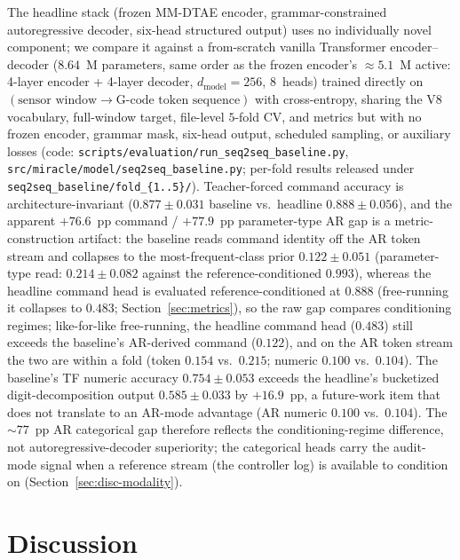 \documentclass[sensors,article,submit,moreauthors,pdftex]{Definitions/mdpi}
\begin{document}
The headline stack (frozen MM-DTAE encoder, grammar-constrained autoregressive decoder, six-head structured output) uses no individually novel component; we compare it against a from-scratch vanilla Transformer encoder--decoder ($8.64$~M parameters, same order as the frozen encoder's $\approx\!5.1$~M active: 4-layer encoder + 4-layer decoder, $d_{\text{model}}\!=\!256$, $8$~heads) trained directly on $(\text{sensor window}\!\to\!\text{G-code token sequence})$ with cross-entropy, sharing the V8 vocabulary, full-window target, file-level $5$-fold CV, and metrics but with no frozen encoder, grammar mask, six-head output, scheduled sampling, or auxiliary losses (code: \texttt{scripts/evaluation/run\_seq2seq\_baseline.py}, \texttt{src/miracle/model/seq2seq\_baseline.py}; per-fold results released under \texttt{seq2seq\_baseline/fold\_\{1..5\}/}). Teacher-forced command accuracy is architecture-invariant ($0.877 \pm 0.031$ baseline vs.\ headline $0.888 \pm 0.056$), and the apparent $+76.6$~pp command / $+77.9$~pp parameter-type AR gap is a metric-construction artifact: the baseline reads command identity off the AR token stream and collapses to the most-frequent-class prior $0.122 \pm 0.051$ (parameter-type read: $0.214 \pm 0.082$ against the reference-conditioned $0.993$), whereas the headline command head is evaluated reference-conditioned at $0.888$ (free-running it collapses to $0.483$; Section~\ref{sec:metrics}), so the raw gap compares conditioning regimes; like-for-like free-running, the headline command head ($0.483$) still exceeds the baseline's AR-derived command ($0.122$), and on the AR token stream the two are within a fold (token $0.154$ vs.\ $0.215$; numeric $0.100$ vs.\ $0.104$). The baseline's TF numeric accuracy $0.754 \pm 0.053$ exceeds the headline's bucketized digit-decomposition output $0.585 \pm 0.033$ by $+16.9$~pp, a future-work item that does not translate to an AR-mode advantage (AR numeric $0.100$ vs.\ $0.104$). The $\sim$$77$~pp AR categorical gap therefore reflects the conditioning-regime difference, not autoregressive-decoder superiority; the categorical heads carry the audit-mode signal when a reference stream (the controller log) is available to condition on (Section~\ref{sec:disc-modality}).

\section{Discussion}
\label{sec:discussion}
\end{document}

